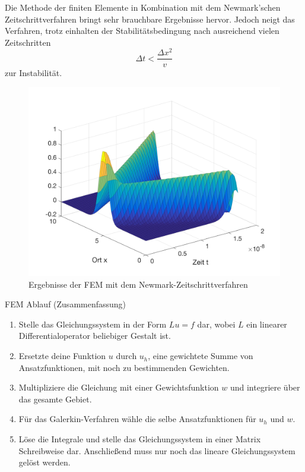 	Die Methode der finiten Elemente in Kombination mit dem Newmark'schen Zeitschrittverfahren bringt sehr brauchbare Ergebnisse hervor. Jedoch neigt das Verfahren, trotz einhalten der Stabilitätsbedingung nach ausreichend vielen Zeitschritten
	\begin{equation}
		\Delta t < \frac{\Delta x^2}{v}
	\end{equation}
	 zur Instabilität.
	
	\begin{figure}[!h]
		\centering
		\includegraphics[width=\linewidth]{../Matlab/wave}
		\caption{Ergebnisse der FEM mit dem Newmark-Zeitschrittverfahren}
		\label{fig:wave}
	\end{figure}
	
	
	FEM Ablauf (Zusammenfassung)
	\begin{enumerate}
		\item Stelle das Gleichungssystem in der Form $Lu = f$ dar, wobei $L$ ein linearer Differentialoperator beliebiger Gestalt ist.
		\item Ersetzte deine Funktion $u$ durch $u_h$, eine gewichtete Summe von Ansatzfunktionen, mit noch zu bestimmenden Gewichten.
		\item Multipliziere die Gleichung mit einer Gewichtsfunktion $w$ und integriere über das gesamte Gebiet.
		\item Für das Galerkin-Verfahren wähle die selbe Ansatzfunktionen für $u_h$ und $w$.
		\item Löse die Integrale und stelle das Gleichungssystem in einer Matrix Schreibweise dar. Anschließend muss nur noch das lineare Gleichungssystem gelöst werden.
	\end{enumerate}